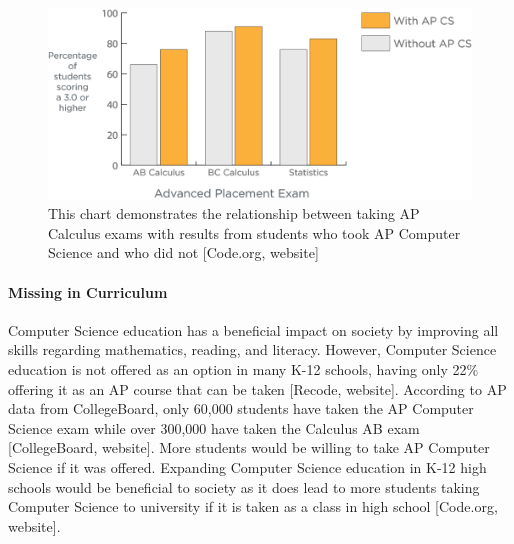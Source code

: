 \documentclass[12pt, letterpaper]{report}
\begin{document}
\begin{figure}[H]
    \centering
    \includegraphics[scale=0.85]{figure13.png}
    \captionsetup{justification=centering}
    \caption{This chart demonstrates the relationship between taking AP Calculus exams with results from students who took AP Computer Science and who did not [Code.org, website]}
\end{figure}

\paragraph*{Missing in Curriculum\\}

Computer Science education has a beneficial impact on society by improving all skills regarding mathematics, reading, and literacy. However, Computer Science education is not offered as an option in many K-12 schools, having only 22\% offering it as an AP course that can be taken [Recode, website]. According to AP data from CollegeBoard, only 60,000 students have taken the AP Computer Science exam while over 300,000 have taken the Calculus AB exam [CollegeBoard, website]. More students would be willing to take AP Computer Science if it was offered. Expanding Computer Science education in K-12 high schools would be beneficial to society as it does lead to more students taking Computer Science to university if it is taken as a class in high school [Code.org, website]. 
\end{document}
